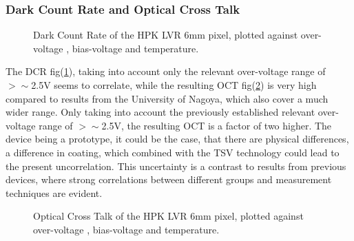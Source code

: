 \documentclass[12pt,article,type=msc,colorback,accentcolor=tud9c]{tudthesis}
\begin{document}
\subsubsection{Dark Count Rate and Optical Cross Talk}
\label{subsubsec:LVR6DCROCT}
\begin{figure}[h]
\begin{centering}
\caption[LCT5 LVR 6mm DCR]{Dark Count Rate of the HPK LVR 6mm pixel, plotted against over-voltage , bias-voltage and temperature.}
\label{fig:LVR6_DCR}
\end{centering}
\end{figure}
The DCR fig(\ref{fig:LVR6_DCR}), taking into account only the relevant over-voltage range of $>\sim$2.5V seems to correlate, while the resulting OCT fig(\ref{fig:LVR6_OCT}) is very high compared to results from the University of Nagoya, which also cover a much wider range. Only taking into account the previously established relevant over-voltage range of $>\sim$2.5V, the resulting OCT is a factor of two higher. The device being a prototype, it could be the case, that there are physical differences, a difference in coating, which combined with the TSV technology could lead to the present uncorrelation\cite{Yamamoto}. This uncertainty is a contrast to results from previous devices, where strong correlations between different groups and measurement techniques are evident.
\begin{figure}[h]
\begin{centering}
\caption[LCT5 LVR 6mm OCT]{Optical Cross Talk of the HPK LVR 6mm pixel, plotted against over-voltage , bias-voltage and temperature.}
\label{fig:LVR6_OCT}
\end{centering}
\end{figure}


\clearpage
\end{document}
